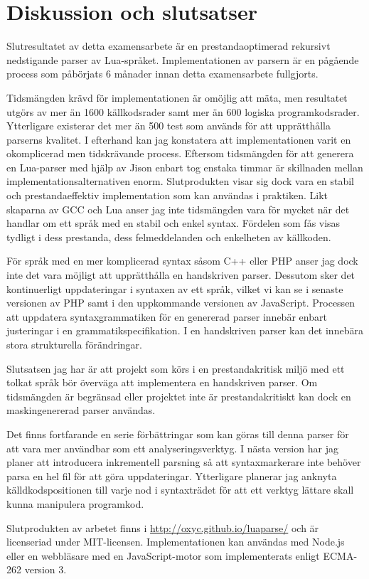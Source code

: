 \section{Diskussion och slutsatser}

Slutresultatet av detta examensarbete är en prestandaoptimerad rekursivt
nedstigande parser av Lua-språket. Implementationen av parsern är en pågående
process som påbörjats 6 månader innan detta examensarbete fullgjorts.

Tidsmängden krävd för implementationen är omöjlig att mäta, men resultatet
utgörs av mer än 1600 källkodsrader samt mer än 600 logiska programkodsrader.
Ytterligare existerar det mer än 500 test som används för att upprätthålla
parserns kvalitet. I efterhand kan jag konstatera att implementationen varit
en okomplicerad men tidskrävande process. Eftersom tidsmängden för att
generera en Lua-parser med hjälp av Jison enbart tog enstaka timmar är
skillnaden mellan implementationsalternativen enorm. Slutprodukten visar sig
dock vara en stabil och prestandaeffektiv implementation som kan användas i
praktiken. Likt skaparna av GCC och Lua anser jag inte tidsmängden vara för
mycket när det handlar om ett språk med en stabil och enkel syntax. Fördelen
som fås visas tydligt i dess prestanda, dess felmeddelanden och enkelheten av
källkoden.

För språk med en mer komplicerad syntax såsom C++ eller PHP anser jag dock
inte det vara möjligt att upprätthålla en handskriven parser. Dessutom sker
det kontinuerligt uppdateringar i syntaxen av ett språk, vilket vi kan se i
senaste versionen av PHP samt i den uppkommande versionen av JavaScript.
Processen att uppdatera syntaxgrammatiken för en genererad parser innebär
enbart justeringar i en grammatikspecifikation. I en handskriven parser kan
det innebära stora strukturella förändringar.

Slutsatsen jag har är att projekt som körs i en prestandakritisk miljö med ett
tolkat språk bör överväga att implementera en handskriven parser. Om
tidsmängden är begränsad eller projektet inte är prestandakritiskt kan dock en
maskingenererad parser användas.

Det finns fortfarande en serie förbättringar som kan göras till denna
parser för att vara mer användbar som ett analyseringsverktyg. I nästa version
har jag planer att introducera inkrementell parsning så att syntaxmarkerare
inte behöver parsa en hel fil för att göra uppdateringar. Ytterligare planerar
jag anknyta källdkodspositionen till varje nod i syntaxträdet för att ett
verktyg lättare skall kunna manipulera programkod.

Slutprodukten av arbetet finns i \url{http://oxyc.github.io/luaparse/} och är
licenseriad under MIT-licensen. Implementationen kan användas med Node.js
eller en webbläsare med en JavaScript-motor som implementerats enligt ECMA-262
version 3.

